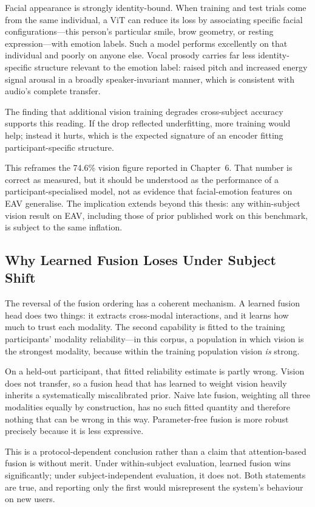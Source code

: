 Facial appearance is strongly identity-bound. When training and test trials come from
the same individual, a ViT can reduce its loss by associating specific facial
configurations---this person's particular smile, brow geometry, or resting
expression---with emotion labels. Such a model performs excellently on that individual
and poorly on anyone else. Vocal prosody carries far less identity-specific structure
relevant to the emotion label: raised pitch and increased energy signal arousal in a
broadly speaker-invariant manner, which is consistent with audio's complete transfer.

The finding that additional vision training degrades cross-subject accuracy supports
this reading. If the drop reflected underfitting, more training would help; instead it
hurts, which is the expected signature of an encoder fitting participant-specific
structure.

This reframes the 74.6\% vision figure reported in Chapter~6. That number is correct
as measured, but it should be understood as the performance of a
participant-specialised model, not as evidence that facial-emotion features on EAV
generalise. The implication extends beyond this thesis: any within-subject vision
result on EAV, including those of prior published work on this benchmark, is subject
to the same inflation.

\subsection{Why Learned Fusion Loses Under Subject Shift}

The reversal of the fusion ordering has a coherent mechanism. A learned fusion head
does two things: it extracts cross-modal interactions, and it learns how much to
trust each modality. The second capability is fitted to the training participants'
modality reliability---in this corpus, a population in which vision is the strongest
modality, because within the training population vision \emph{is} strong.

On a held-out participant, that fitted reliability estimate is partly wrong. Vision
does not transfer, so a fusion head that has learned to weight vision heavily inherits
a systematically miscalibrated prior. Naive late fusion, weighting all three modalities
equally by construction, has no such fitted quantity and therefore nothing that can be
wrong in this way. Parameter-free fusion is more robust precisely because it is less
expressive.

This is a protocol-dependent conclusion rather than a claim that attention-based
fusion is without merit. Under within-subject evaluation, learned fusion wins
significantly; under subject-independent evaluation, it does not. Both statements are
true, and reporting only the first would misrepresent the system's behaviour on new
users.

